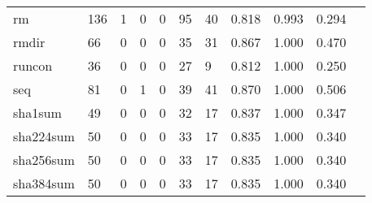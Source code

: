 \begin{longtable}{lp{1.10cm}p{1.10cm}p{1.10cm}p{1.10cm}p{1.10cm}p{1.10cm}p{1.10cm}p{1.10cm}p{1.10cm}p{1.10cm}}
rm        &                    136 &                                  1 &                                 0 &                                0 &                                95 &                              40 &                          0.818 &                                 0.993 &                               0.294 \\
rmdir     &                     66 &                                  0 &                                 0 &                                0 &                                35 &                              31 &                          0.867 &                                 1.000 &                               0.470 \\
runcon    &                     36 &                                  0 &                                 0 &                                0 &                                27 &                               9 &                          0.812 &                                 1.000 &                               0.250 \\
seq       &                     81 &                                  0 &                                 1 &                                0 &                                39 &                              41 &                          0.870 &                                 1.000 &                               0.506 \\
sha1sum   &                     49 &                                  0 &                                 0 &                                0 &                                32 &                              17 &                          0.837 &                                 1.000 &                               0.347 \\
sha224sum &                     50 &                                  0 &                                 0 &                                0 &                                33 &                              17 &                          0.835 &                                 1.000 &                               0.340 \\
sha256sum &                     50 &                                  0 &                                 0 &                                0 &                                33 &                              17 &                          0.835 &                                 1.000 &                               0.340 \\
sha384sum &                     50 &                                  0 &                                 0 &                                0 &                                33 &                              17 &                          0.835 &                                 1.000 &                               0.340 \\

\end{longtable}
